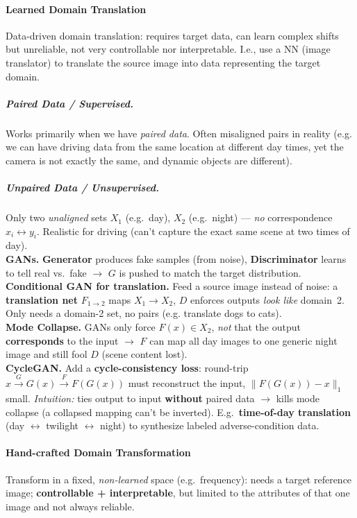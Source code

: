 \documentclass{article}
\begin{document}
\paragraph{Learned Domain Translation}
Data-driven domain translation: requires target data, can learn complex shifts but unreliable, not very controllable nor interpretable. I.e., use a NN (image translator) to translate the source image into data representing the target domain.

\subparagraph{Paired Data / Supervised.} Works primarily when we have \textit{paired data}. Often misaligned pairs in reality (e.g. we can have driving data from the same location at different day times, yet the camera is not exactly the same, and dynamic objects are different).

\subparagraph{Unpaired Data / Unsupervised.} Only two \textit{unaligned} sets $X_1$ (e.g.\ day), $X_2$ (e.g.\ night) --- \textit{no} correspondence $x_i\leftrightarrow y_i$. Realistic for driving (can't capture the exact same scene at two times of day).\\

\textbf{GANs.} \textbf{Generator} produces fake samples (from noise), \textbf{Discriminator} learns to tell real vs.\ fake $\rightarrow$ $G$ is pushed to match the target distribution.\\

\textbf{Conditional GAN for translation.} Feed a source image instead of noise: a \textbf{translation net} $F_{1\to2}$ maps $X_1\!\to\!X_2$, $D$ enforces outputs \textit{look like} domain~2. Only needs a domain-2 set, no pairs (e.g. translate dogs to cats).\\

\textbf{Mode Collapse.} GANs only force $F(x)\in X_2$, \textit{not} that the output \textbf{corresponds} to the input $\rightarrow$ $F$ can map all day images to one generic night image and still fool $D$ (scene content lost).\\

\textbf{CycleGAN.} Add a \textbf{cycle-consistency loss}: round-trip $x \xrightarrow{G} G(x) \xrightarrow{F} F(G(x))$ must reconstruct the input, $\lVert F(G(x))-x\rVert_1$ small. \textit{Intuition:} ties output to input \textbf{without} paired data $\rightarrow$ kills mode collapse (a collapsed mapping can't be inverted). E.g.\ \textbf{time-of-day translation} (day $\leftrightarrow$ twilight $\leftrightarrow$ night) to synthesize labeled adverse-condition data.

\paragraph{Hand-crafted Domain Transformation}
Transform in a fixed, \textit{non-learned} space (e.g.\ frequency): needs a target reference image; \textbf{controllable + interpretable}, but limited to the attributes of that one image and not always reliable.
\end{document}
